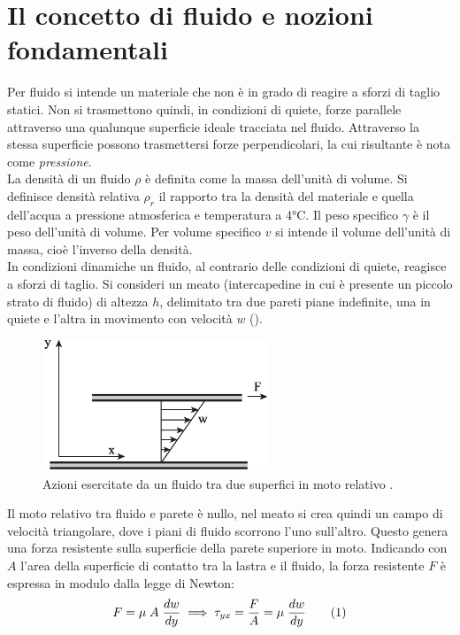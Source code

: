 \section{Il concetto di fluido e nozioni fondamentali}
Per fluido si intende un materiale che non è in grado di reagire a sforzi di taglio statici. Non si trasmettono quindi, in condizioni di quiete, forze parallele attraverso una qualunque superficie ideale tracciata nel fluido. Attraverso la stessa superficie possono trasmettersi forze perpendicolari, la cui risultante è nota come \textit{pressione}.\\
La densità di un fluido \(\rho\) è definita come la massa dell'unità di volume. Si definisce densità relativa \(\rho_r\) il rapporto tra la densità del materiale e quella dell'acqua a pressione atmosferica e temperatura a 4°C. Il peso specifico \(\gamma\) è il peso dell'unità di volume. Per volume specifico \(v\) si intende il volume dell'unità di massa, cioè l'inverso della densità. \\
In condizioni dinamiche un fluido, al contrario delle condizioni di quiete, reagisce a sforzi di taglio. Si consideri un meato (intercapedine in cui è presente un piccolo strato di fluido) di altezza \(h\), delimitato tra due pareti piane indefinite, una in quiete e l'altra in movimento con velocità \(w\) ().
\begin{figure}[htbp] %
    \centering
    \includegraphics[width=0.6\textwidth]{fig/fluidodinamica/meato.eps}
    \caption{Azioni esercitate da un fluido tra due superfici in moto relativo \parencite{guglielmini2004lezioni}.} 
    \label{fig:meato}
\end{figure}
Il moto relativo tra fluido e parete è nullo, nel meato si crea quindi un campo di velocità triangolare, dove i piani di fluido scorrono l'uno sull'altro. Questo genera una forza resistente sulla superficie della parete superiore in moto. Indicando con \(A\) l'area della superficie di contatto tra  la lastra e il fluido, la forza resistente \(F\) è espressa in modulo dalla legge di Newton:
\[F= \mu \; A \; \frac{dw}{dy} \implies \tau_{yx} = \frac{F}{A} = \mu \; \frac{dw}{dy} \addtag \label{eq:newton} \]
